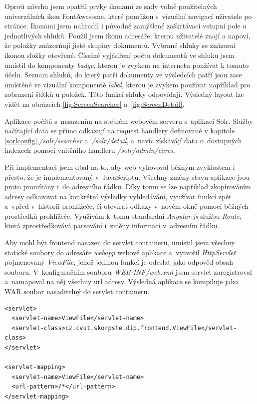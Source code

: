Oproti návrhu jsem opatřil prvky ikonami ze sady volně použitelných univerzálních ikon FontAwesome\cite{fontawesome}, které pomůžou s~vizuální navigací uživatele po stránce. Ikonami jsem nahradil i původně zamýšlené zaškrtávací vstupní pole u jednotlivých shluků. Použil jsem ikonu adresáře, kterou uživatelé znají a napoví, že položky znázorňují jisté skupiny dokumentů. Vybrané shluky se znázorní ikonou složky otevřené. Číselné vyjádření počtu dokumentů ve shluku jsem umístil do komponenty \emph{badge}, kterou je zvykem na internetu používat k tomuto účelu. Seznam shluků, do který patří dokumenty ve výsledcích patří jsou zase umístěné ve vizuální komponentě \emph{label}, kterou je zvykem používat například pro zobrazení štítků u položek. Této funkci shluky odpovídají. Výsledný layout lze vidět na obrázcích \ref{fig:ScreenSearcher} a~\ref{fig:ScreenDetail}.

Aplikace počítá s~nasazením na stejném webovém serveru s~aplikací Solr. Služby načítající data se přímo odkazují na request handlery definované v kapitole \ref{sorlconfig},\emph{/solr/searcher} a~\emph{/solr/detail}, a~navíc získávájí data o~dostupných indexech pomocí vnitřního handleru \emph{/solr/admin/cores}.

Při implementaci jsem dbal na to, aby web vyhovoval běžným zvyklostem i přesto, že je implementovaný v~JavaScriptu. Všechny změny stavu aplikace jsou proto promítány i~do adresního řádku. Díky tomu se lze například zkopírováním adresy odkazovat na konkrétní výsledky vyhledávání, využívat funkcí zpět a~vpřed v~historii prohlížeče, či otevírat odkazy v~novém okně pomocí běžných prostředků prohlížeče. Využívám k~tomu standardní \emph{Angular.js} službu \emph{Route}, která zprostředkovává parsování i~změny informací v~adresním řádku.

Aby mohl být frontend nasazen do servlet containeru, umístil jsem všechny statické soubory do adresáře \emph{webapp} webové aplikace a~vytvořil \emph{HttpServlet} pojmenovaný \emph{ViewFile}, jehož jedinou funkcí je odeslat jako odpověď obsah souboru. V~konfiguračním souboru \emph{WEB-INF/web.xml} jsem servlet zaregistroval a~namapoval na něj všechny url adresy. Výsledná aplikace se kompiluje jako WAR soubor nasaditelný do servlet containeru.

\begin{verbatim}
<servlet>
  <servlet-name>ViewFile</servlet-name>
  <servlet-class>cz.cvut.skorpste.dip.frontend.ViewFile</servlet-class>
</servlet>

<servlet-mapping>
  <servlet-name>ViewFile</servlet-name>
  <url-pattern>/*</url-pattern>
</servlet-mapping>
\end{verbatim}

